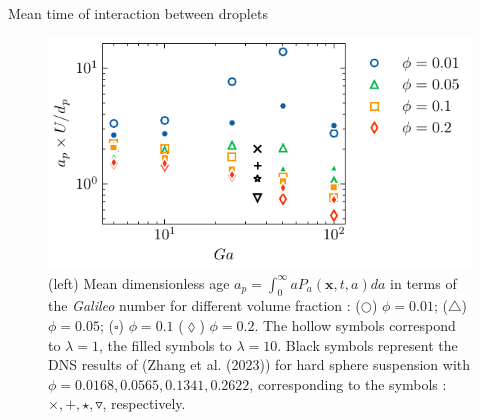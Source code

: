 \documentclass{sintefbeamer}
\begin{document}
\begin{frame}{Mean time of interaction between droplets}
  \begin{figure}[h!]
    \centering
    \includegraphics[height = 0.3\textwidth]{image/HOMOGENEOUS_NEW/PA/age.pdf}
    \caption{
    (left) Mean dimensionless age $a_p =  \int_0^\infty aP_a(\textbf{x},t,a)da$ in terms of the \textit{Galileo} number for different volume fraction :   
    ($\pmb\bigcirc$) $\phi = 0.01$; ($\pmb\triangle$) $ \phi = 0.05$; ($\pmb\square$) $\phi = 0.1$ ($\pmb\lozenge$) $\phi = 0.2$.
    The hollow symbols correspond to $\lambda = 1$, the filled symbols to $\lambda = 10$.
    Black symbols represent the DNS results of (Zhang et al. (2023)) for hard sphere suspension with $\phi = 0.0168,0.0565,0.1341,0.2622$, corresponding to the symbols : $\pmb\times, \pmb +, \pmb\star , \pmb\triangledown$, respectively.
    }
    \label{fig:tau_p}
\end{figure}
\end{frame}
\end{document}
